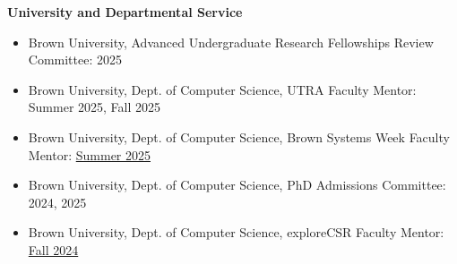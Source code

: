 \noindent\hspace{1cm}
\textbf{University and Departmental Service}
\begin{itemize}[leftmargin=1.5cm]\setlength{\itemsep}{0pt}
  \item Brown University, Advanced Undergraduate Research Fellowships Review Committee: 2025
  \item Brown University, Dept. of Computer Science, UTRA Faculty Mentor: Summer 2025, Fall 2025
  \item Brown University, Dept. of Computer Science, Brown Systems Week Faculty Mentor: \href{brown-systems-week.github.io}{Summer 2025}
  \item Brown University, Dept. of Computer Science, PhD Admissions Committee: 2024, 2025
  \item Brown University, Dept. of Computer Science, exploreCSR Faculty Mentor: \href{https://explorecsr.cs.brown.edu/systems/index.html}{Fall 2024}
\end{itemize}
